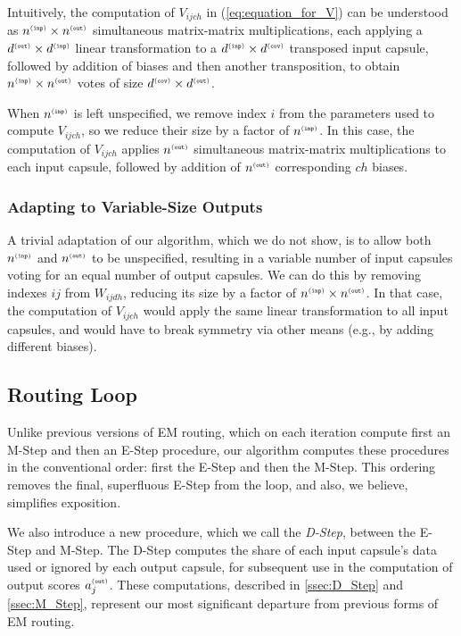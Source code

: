 \documentclass[11pt,a4paper]{article}
\newcommand{\suptag}[1]{^{{\scriptscriptstyle\tt (#1)}}}
\newcommand{\cov}{\suptag{cov}}  \newcommand{\inp}{\suptag{inp}}  \newcommand{\out}{\suptag{out}}
\begin{document}
Intuitively, the computation of $V_{ijch}$ in (\ref{eq:equation_for_V}) can be understood as $n\inp \times n\out$ simultaneous matrix-matrix multiplications, each applying a $d\out \times d\inp$ linear transformation to a $d\inp \times d\cov$ transposed input capsule, followed by addition of biases and then another transposition, to obtain $n\inp \times n\out$ votes of size $d\cov \times d\out$.

When $n\inp$ is left unspecified, we remove index $i$ from the parameters used to compute $V_{ijch}$, so we reduce their size by a factor of $n\inp$. In this case, the computation of $V_{ijch}$ applies $n\out$ simultaneous matrix-matrix multiplications to each input capsule, followed by addition of $n\out$ corresponding $ch$ biases.

\subsubsection{Adapting to Variable-Size Outputs}
\label{sssec:handling_variable_size_outputs}

A trivial adaptation of our algorithm, which we do not show, is to allow both $n\inp$ and $n\out$ to be unspecified, resulting in a variable number of input capsules voting for an equal number of output capsules. We can do this by removing indexes $ij$ from $W_{ijdh}$, reducing its size by a factor of $n\inp \times n\out$. In that case, the computation of $V_{ijch}$ would apply the same linear transformation to all input capsules, and would have to break symmetry via other means (e.g., by adding different biases).

\subsection{Routing Loop}\label{ssec:routing_iterations}

Unlike previous versions of EM routing, which on each iteration compute first an M-Step and then an E-Step procedure, our algorithm computes these procedures in the conventional order: first the E-Step and then the M-Step. This ordering removes the final, superfluous E-Step from the loop, and also, we believe, simplifies exposition.

We also introduce a new procedure, which we call the \emph{D-Step}, between the E-Step and M-Step. The D-Step computes the share of each input capsule's data used or ignored by each output capsule, for subsequent use in the computation of output scores $a\out_j$. These computations, described in \ref{ssec:D_Step} and \ref{ssec:M_Step}, represent our most significant departure from previous forms of EM routing.
\end{document}
